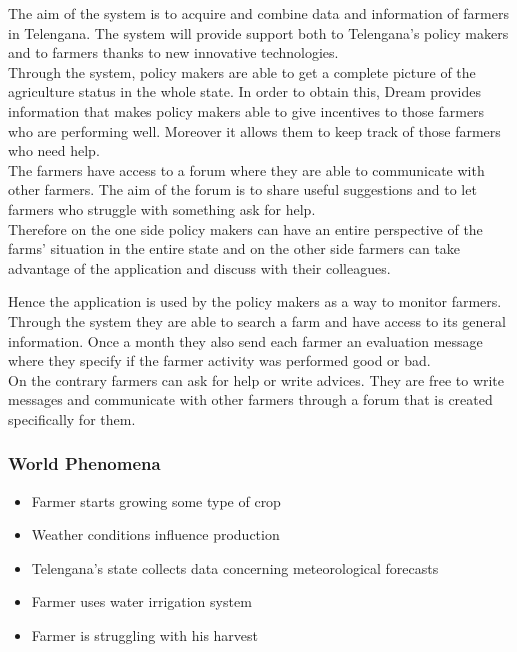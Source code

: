 The aim of the system is to acquire and combine data and information of farmers in Telengana. 
The system will provide support both to Telengana’s policy makers and to farmers 
thanks to new innovative technologies.\\
Through the system, policy makers are able 
to get a complete picture of the agriculture status in the whole state. In order 
to obtain this, Dream provides information that makes policy makers able to give 
incentives to those farmers who are performing well. Moreover it allows them to 
keep track of those farmers who need help. \\
The farmers have access to a forum where they are able to communicate with other 
farmers. The aim of the forum is to share useful suggestions and to let farmers 
who struggle with something ask for help. \\
Therefore on the one side policy makers can have an entire perspective of the farms’ 
situation in the entire state and on the other side farmers can take advantage of the 
application and discuss with their colleagues.
\par 
Hence the application is used by the policy makers as a way to monitor farmers. 
Through the system they are able to search a farm and have access to its general information. 
Once a month they also send each farmer an evaluation message where they specify if the farmer activity was
performed good or bad.\\
On the contrary farmers can ask for help or write advices. They are free to write messages and communicate with other farmers through a forum 
that is created specifically for them.




\subsubsection{World Phenomena}
\begin{itemize}
    \item Farmer starts growing some type of crop
    \item Weather conditions influence production
    \item Telengana’s state collects data concerning meteorological forecasts
    \item Farmer uses water irrigation system
    \item Farmer is struggling with his harvest  
    
\end{itemize}

